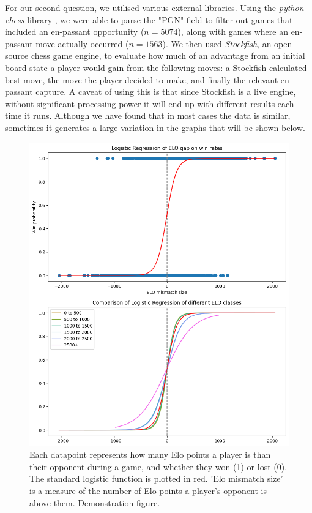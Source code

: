 \documentclass[10pt,a4paper]{article}
\begin{document}
\begin{multicols}{2}
For our second question, we utilised various external libraries. Using the \textit{python-chess} library \cite{python-chess}, we were able to parse the "PGN" field to filter out games that included an en-passant opportunity ($n=5074$), along with games where an en-passant move actually occurred ($n=1563$). We then used \textit{Stockfish}\cite{StockFish}, an open source chess game engine, to evaluate how much of an advantage from an initial board state a player would gain from the following moves: a Stockfish calculated best move, the move the player decided to make, and finally the relevant en-passant capture. A caveat of using this is that since Stockfish is a live engine, without significant processing power it will end up with different results each time it runs. Although we have found that in most cases the data is similar, sometimes it generates a large variation in the graphs that will be shown below. \newline
\begin{figure}[p]
  \centering
  \includegraphics[width=\textwidth]{report/images/log_regression_dual.png}
  \caption{Each datapoint represents how many Elo points a player is than their opponent during a game, and whether they won (1) or lost (0). The standard logistic function is plotted in red. 'Elo mismatch size' is a measure of the number of Elo points a player's opponent is above them.
  Demonstration figure.}
  \label{fds-project-template:fig:log_regression}
\end{figure}



\end{multicols}
\end{document}
